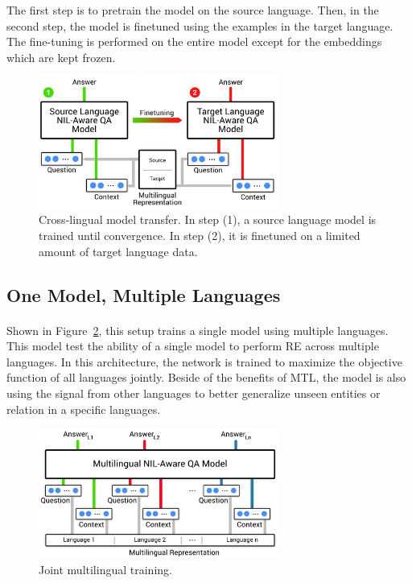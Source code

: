 The first step is to pretrain the model on the source language. Then, in the second step, the model is finetuned using the examples in the target language. The fine-tuning is performed on the entire model except for the embeddings which are kept frozen.

\begin{figure}[h]
    \centering
    \includegraphics[width=0.7\textwidth]{images/model_v2.pdf}
    \caption{Cross-lingual model transfer. In step (1), a source language model is trained until convergence. In step (2), it is finetuned on a limited amount of target language data.}
    \label{fig:setupTransfer}
\end{figure}%

\subsection{One Model, Multiple Languages}
\label{sec:onemodel}
\paragraph{}
Shown in Figure~\ref{fig:setupMulti}, this setup trains a single model using multiple languages. This model test the ability of a single model to perform RE across multiple languages. In this architecture, the network is trained to maximize the objective function of all languages jointly. Beside of the benefits of MTL, the model is also using the signal from other languages to better generalize unseen entities or relation in a specific languages.



\begin{figure}[h]
    \centering
     \includegraphics[width=0.7\textwidth]{images/model_joint_unique.pdf}
    \caption{Joint multilingual training.}
    \label{fig:setupMulti}
\end{figure}

